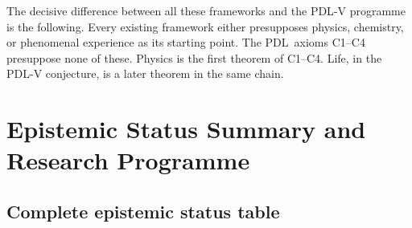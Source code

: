 \documentclass[12pt,a4paper]{article}
\theoremstyle{plain}
\theoremstyle{definition}
\theoremstyle{remark}
\newcommand{\PDL}{\textsc{PDL}}
\begin{document}
The decisive difference between all these frameworks and the \PDL-V programme is the
following. Every existing framework either presupposes physics, chemistry, or
phenomenal experience as its starting point. The \PDL\ axioms C1--C4 presuppose
none of these. Physics is the first theorem of C1--C4. Life, in the \PDL-V conjecture,
is a later theorem in the same chain.

\section{Epistemic Status Summary and Research Programme}
\label{sec:programme}

\subsection{Complete epistemic status table}
\end{document}
